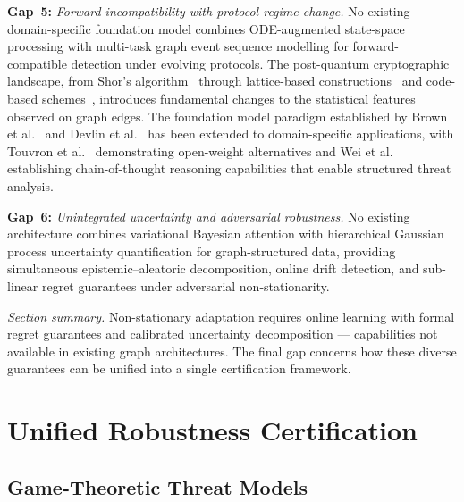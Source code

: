 \medskip
\noindent\textbf{Gap~5:} \emph{Forward incompatibility with protocol regime change.} No existing domain-specific foundation model combines ODE-augmented state-space processing with multi-task graph event sequence modelling for forward-compatible detection under evolving protocols. The post-quantum cryptographic landscape, from Shor's algorithm~\cite{Shor1997} through lattice-based constructions~\cite{Ducas2018,Proos2003} and code-based schemes~\cite{McEliece1978}, introduces fundamental changes to the statistical features observed on graph edges. The foundation model paradigm established by Brown et al.~\cite{Brown2020} and Devlin et al.~\cite{Devlin2019} has been extended to domain-specific applications, with Touvron et al.~\cite{Touvron2023} demonstrating open-weight alternatives and Wei et al.~\cite{Wei2022cot} establishing chain-of-thought reasoning capabilities that enable structured threat analysis.

\medskip
\noindent\textbf{Gap~6:} \emph{Unintegrated uncertainty and adversarial robustness.} No existing architecture combines variational Bayesian attention with hierarchical Gaussian process uncertainty quantification for graph-structured data, providing simultaneous epistemic--aleatoric decomposition, online drift detection, and sub-linear regret guarantees under adversarial non-stationarity.

\medskip
\noindent\textit{Section summary.} Non-stationary adaptation requires online learning with formal regret guarantees and calibrated uncertainty decomposition --- capabilities not available in existing graph architectures. The final gap concerns how these diverse guarantees can be unified into a single certification framework.


\section{Unified Robustness Certification}
\label{sec:certification}

\subsection{Game-Theoretic Threat Models}

